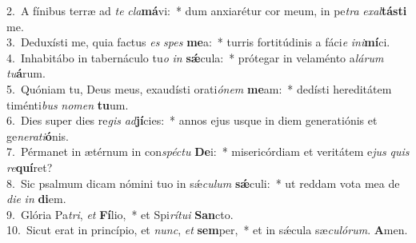 {2.~}A fínibus terræ ad \textit{te} \textit{cla}\textbf{má}vi:~* dum anxiarétur cor meum, in pe\textit{tra} \textit{e}\textit{xal}\textbf{tá}\textbf{sti} me.\\
{3.~}Deduxísti me, quia factus \textit{es} \textit{spes} \textbf{me}a:~* turris fortitúdinis a fáci\textit{e} \textit{i}\textit{ni}\textbf{mí}ci.\\
{4.~}Inhabitábo in tabernáculo tu\textit{o} \textit{in} \textbf{sǽ}cula:~* prótegar in velaménto a\textit{lá}\textit{rum} \textit{tu}\textbf{á}rum.\\
{5.~}Quóniam tu, Deus meus, exaudísti orati\textit{ó}\textit{nem} \textbf{me}am:~* dedísti hereditátem timénti\textit{bus} \textit{no}\textit{men} \textbf{tu}um.\\
{6.~}Dies super dies re\textit{gis} \textit{ad}\textbf{jí}cies:~* annos ejus usque in diem generatiónis et ge\textit{ne}\textit{ra}\textit{ti}\textbf{ó}nis.\\
{7.~}Pérmanet in ætérnum in con\textit{spé}\textit{ctu} \textbf{De}i:~* misericórdiam et veritátem e\textit{jus} \textit{quis} \textit{re}\textbf{quí}ret?\\
{8.~}Sic psalmum dicam nómini tuo in sǽ\textit{cu}\textit{lum} \textbf{sǽ}culi:~* ut reddam vota mea de \textit{di}\textit{e} \textit{in} \textbf{di}em.\\
{9.~}Glória Pa\textit{tri}, \textit{et} \textbf{Fí}lio,~* et Spi\textit{rí}\textit{tu}\textit{i} \textbf{San}cto.\\
{10.~}Sicut erat in princípio, et \textit{nunc}, \textit{et} \textbf{sem}per,~* et in sǽcula sæ\textit{cu}\textit{ló}\textit{rum}. \textbf{A}men.\\
